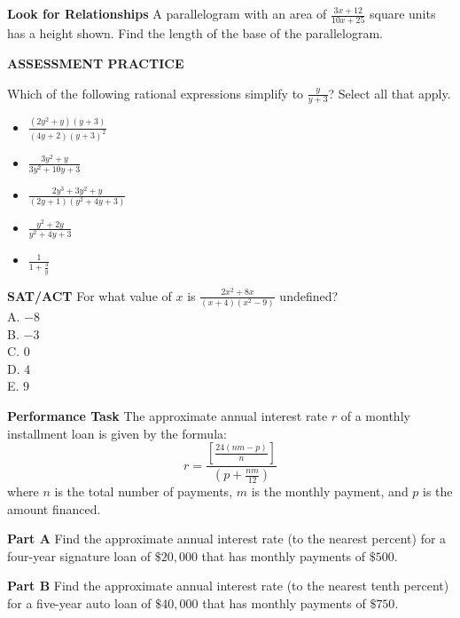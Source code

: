 \documentclass{article}
\newenvironment{practice}[2]{}{}
\begin{document}
\begin{practice}{37}{1}
\textbf{Look for Relationships} A parallelogram with an area of $\frac{3x + 12}{10x + 25}$ square units has a height shown. Find the length of the base of the parallelogram.

\end{practice}

\textbf{ASSESSMENT PRACTICE}

\begin{practice}{38}{1}
Which of the following rational expressions simplify to $\frac{y}{y + 3}$? Select all that apply.
\begin{itemize}
    \item[$\square$] $\frac{(2y^2 + y)(y + 3)}{(4y + 2)(y + 3)^2}$
    \item[$\square$] $\frac{3y^2 + y}{3y^2 + 10y + 3}$
    \item[$\square$] $\frac{2y^3 + 3y^2 + y}{(2y + 1)(y^2 + 4y + 3)}$
    \item[$\square$] $\frac{y^2 + 2y}{y^2 + 4y + 3}$
    \item[$\square$] $\frac{1}{1 + \frac{3}{y}}$
\end{itemize}
\end{practice}

\begin{practice}{39}{1}
\textbf{SAT/ACT} For what value of $x$ is $\frac{2x^2 + 8x}{(x + 4)(x^2 - 9)}$ undefined? \\
A. $-8$ \\
B. $-3$ \\
C. $0$ \\
D. $4$ \\
E. $9$
\end{practice}

\begin{practice}{40}{1}
\textbf{Performance Task} The approximate annual interest rate $r$ of a monthly installment loan is given by the formula:
$$ r = \frac{\left[ \frac{24(nm - p)}{n} \right]}{\left( p + \frac{nm}{12} \right)} $$
where $n$ is the total number of payments, $m$ is the monthly payment, and $p$ is the amount financed.

\textbf{Part A} Find the approximate annual interest rate (to the nearest percent) for a four-year signature loan of $\$20,000$ that has monthly payments of $\$500$.

\textbf{Part B} Find the approximate annual interest rate (to the nearest tenth percent) for a five-year auto loan of $\$40,000$ that has monthly payments of $\$750$.
\end{practice}
\end{document}
